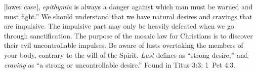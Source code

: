 [lower case], \emph{epithymia} is always a danger against which man must be warned and must fight.'' We should understand that we have natural desires and cravings that are impulsive. The impulsive part may only be heavily defeated when we go through sanctification. The purpose of the mosaic law for Christians is to discover their evil uncontrollable impulses. Be aware of lusts overtaking the members of your body, contrary to the will of the Spirit. \emph{Lust} defines as ``strong desire,'' and \emph{craving} as ``a strong or uncontrollable desire.''
Found in Titus 3:3; 1~Pet 4:3.



